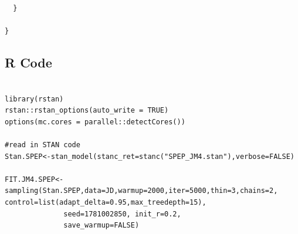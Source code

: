 \begin{SingleSpace}
\begin{verbatim}
  }
  
}

\end{verbatim}

\subsection{R Code}

\begin{verbatim}

library(rstan)
rstan::rstan_options(auto_write = TRUE)
options(mc.cores = parallel::detectCores())

#read in STAN code
Stan.SPEP<-stan_model(stanc_ret=stanc("SPEP_JM4.stan"),verbose=FALSE) 

FIT.JM4.SPEP<-sampling(Stan.SPEP,data=JD,warmup=2000,iter=5000,thin=3,chains=2, control=list(adapt_delta=0.95,max_treedepth=15), 
              seed=1781002850, init_r=0.2,
              save_warmup=FALSE)

\end{verbatim}

\end{SingleSpace}